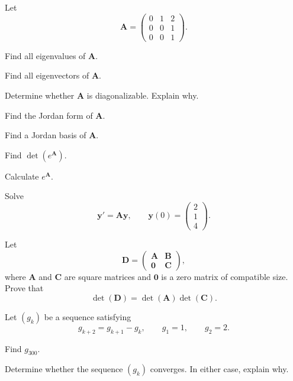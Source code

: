 \begin{problem}
Let
\[
\mathbf A=
\begin{pmatrix}
0&1&2\\
0&0&1\\
0&0&1
\end{pmatrix}.
\]
\begin{problemsubparts}
\item Find all eigenvalues of $\mathbf A$.
\item Find all eigenvectors of $\mathbf A$.
\item Determine whether $\mathbf A$ is diagonalizable. Explain why.
\item Find the Jordan form of $\mathbf A$.
\item Find a Jordan basis of $\mathbf A$.
\item Find $\det(e^{\mathbf A})$.
\item Calculate $e^{\mathbf A}$.
\item Solve
\[
\mathbf y'=\mathbf A\mathbf y,
\qquad
\mathbf y(0)=
\begin{pmatrix}
2\\1\\4
\end{pmatrix}.
\]
\end{problemsubparts}
\end{problem}

\begin{problem}
Let
\[
\mathbf D=
\begin{pmatrix}
\mathbf A&\mathbf B\\
\mathbf 0&\mathbf C
\end{pmatrix},
\]
where $\mathbf A$ and $\mathbf C$ are square matrices and $\mathbf 0$ is a zero matrix of compatible size. Prove that
\[
\det(\mathbf D)=\det(\mathbf A)\det(\mathbf C).
\]
\end{problem}

\begin{problem}
Let $(g_k)$ be a sequence satisfying
\[
g_{k+2}=g_{k+1}-g_k,
\qquad
g_1=1,
\qquad
g_2=2.
\]
\begin{problemsubparts}
\item Find $g_{300}$.
\item Determine whether the sequence $(g_k)$ converges. In either case, explain why.
\end{problemsubparts}
\end{problem}

